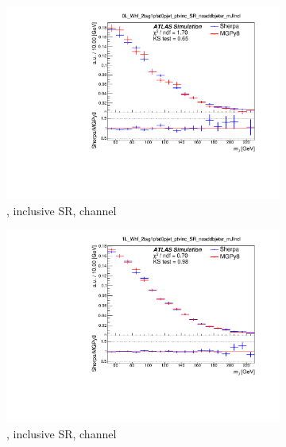 \begin{figure}[!htbp]
  \centering
  \begin{subfigure}{.5\textwidth}
    \includegraphics[width=\textwidth]{chapters/6.vhbb_boosted/figs/0L_Whf_2tag1pfat0pjet_ptvinc_SR_noaddbjetsr_mJIncl.pdf}
    \caption{\Whf, \pTV inclusive SR, \zlep channel}
    \label{fig:Vjets_MGSherpa_inc_sub1}
  \end{subfigure}%
  \hfill
  \begin{subfigure}{.5\textwidth}
    \includegraphics[width=\textwidth]{chapters/6.vhbb_boosted/figs/1L_Whf_2tag1pfat0pjet_ptvinc_SR_noaddbjetsr_mJIncl.pdf}
    \caption{\Whf, \pTV inclusive SR, \olep channel}
    \label{fig:Vjets_MGSherpa_inc_sub2}
  \end{subfigure}
  \begin{subfigure}{.5\textwidth}

\end{subfigure}
\end{figure}
